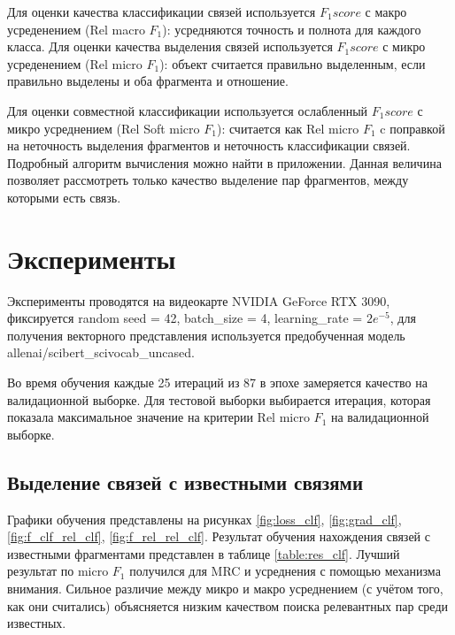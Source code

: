 \documentclass[12pt]{article}
\begin{document}
Для оценки качества классификации связей используется $F_1 score$ с макро усреденением (Rel macro $F_1$): усредняются точность и полнота для каждого класса. Для оценки качества выделения связей используется $F_1 score$ с микро усреденением (Rel micro $F_1$): объект считается правильно выделенным, если правильно выделены и оба фрагмента и отношение.

Для оценки совместной классификации используется ослабленный $F_1 score$ с микро усреднением (Rel Soft micro $F_1$): считается как Rel micro $F_1$ c поправкой на неточность выделения фрагментов и неточность классификации связей. Подробный алгоритм вычисления можно найти в приложении. Данная величина позволяет рассмотреть только качество выделение пар фрагментов, между которыми есть связь.
\clearpage
\section{Эксперименты}
Эксперименты проводятся на видеокарте NVIDIA GeForce RTX 3090, фиксируется random seed = 42, batch\_size = 4, learning\_rate = $2e^{-5}$, для получения векторного представления используется предобученная модель allenai/scibert\_scivocab\_uncased.

Во время обучения каждые 25 итераций из 87 в эпохе замеряется качество на валидационной выборке. Для тестовой выборки выбирается итерация, которая показала максимальное значение на критерии Rel micro $F_1$ на валидационной выборке.

\subsection{Выделение связей с известными связями}
Графики обучения представлены на рисунках \ref{fig:loss_clf}, \ref{fig:grad_clf}, \ref{fig:f_clf_rel_clf}, \ref{fig:f_rel_rel_clf}. Результат обучения нахождения связей с известными фрагментами представлен в таблице \ref{table:res_clf}. Лучший результат по micro $F_1$ получился для MRC и усреднения с помощью механизма внимания. Сильное различие между микро и макро усреднением (с учётом того, как они считались) объясняется низким качеством поиска релевантных пар среди известных.
\end{document}
